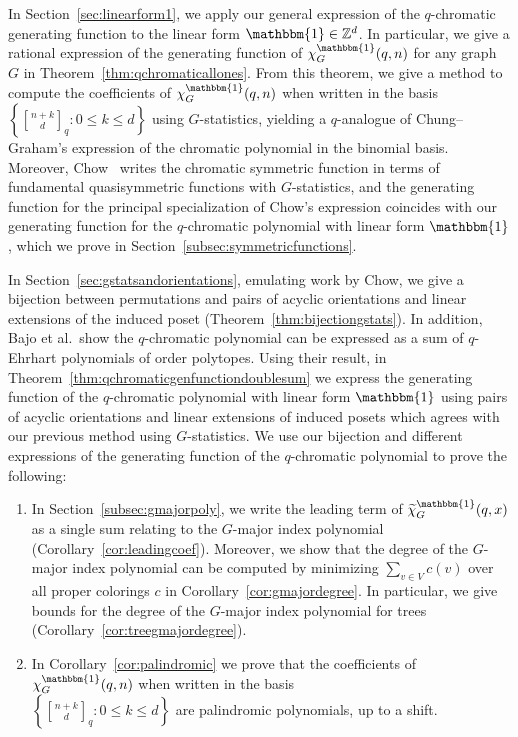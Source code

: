 \documentclass[11pt]{amsart}
\newcommand{\qbinom}[2]{\genfrac[]{0pt}{}{#1}{#2}_q}
\begin{document}
In Section~\ref{sec:linearform1}, we apply our general expression of the $q$-chromatic generating function to the linear form $\mathbbm{1}\in
\mathbb{Z}^d$.
In particular, we give a rational expression of the generating function of $\chi_G^\mathbbm{1}(q,n)$ for any graph $G$ in Theorem~\ref{thm:qchromaticallones}.
From this theorem, we give a method to compute the coefficients of $\chi_G^\mathbbm{1}(q,n)$ when written in the basis
$\left\{\qbinom{n+k}{d} : 0 \leq k \leq d\right\}$ using $G$-statistics, yielding a $q$-analogue of Chung--Graham's expression of the chromatic polynomial in the binomial basis.
Moreover, Chow~\cite{chow1999} writes the chromatic symmetric function in terms of fundamental quasisymmetric
functions with $G$-statistics, and the generating function for the principal specialization of Chow's expression coincides with our generating function for the $q$-chromatic polynomial with linear form $\mathbbm{1}$, which we prove in Section~\ref{subsec:symmetricfunctions}.

In Section~\ref{sec:gstatsandorientations}, emulating work by Chow, we give a bijection
 between permutations and pairs of acyclic orientations and linear extensions of the induced poset (Theorem~\ref{thm:bijectiongstats}).
In addition, Bajo et al.\ show the $q$-chromatic polynomial can be expressed as a sum of $q$-Ehrhart polynomials of order polytopes.
Using their result, in Theorem~\ref{thm:qchromaticgenfunctiondoublesum} we express the generating function of the $q$-chromatic polynomial with linear form $\mathbbm{1}$ using pairs of acyclic orientations and linear extensions of induced posets which agrees with our previous method using $G$-statistics.
We use our bijection and different expressions of the generating function of the $q$-chromatic polynomial to prove the following:
\begin{enumerate}
    \item In Section~\ref{subsec:gmajorpoly}, we write the leading term of
$\widetilde{\chi}_G^\mathbbm{1}(q,x)$ as a single sum relating to the $G$-major index polynomial
(Corollary~\ref{cor:leadingcoef}). 
    Moreover, we show that the degree of the $G$-major index polynomial can be computed by minimizing $\sum_{v \in V} c(v)$ over all proper colorings $c$ in Corollary~\ref{cor:gmajordegree}.
    In particular, we give bounds for the degree of the $G$-major index polynomial for trees 
(Corollary~\ref{cor:treegmajordegree}).

    \item In Corollary~\ref{cor:palindromic} we prove that the coefficients of $\chi_G^\mathbbm{1}(q,n)$ when written in the basis  \\$\left\{\qbinom{n+k}{d} : 0 \leq k \leq d\right\}$
    are palindromic polynomials, up to a shift.
\end{enumerate} 
\end{document}

